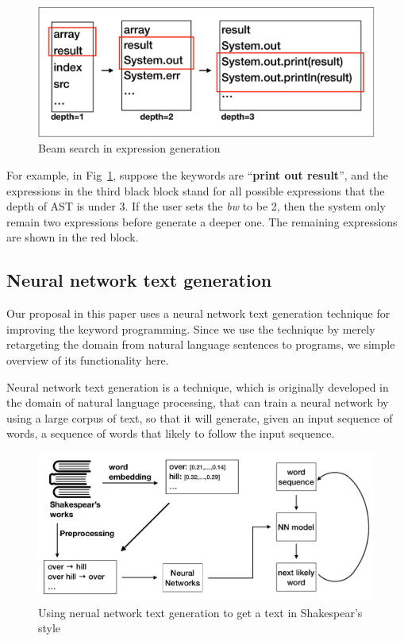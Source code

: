 \documentclass[PRO,english]{ipsj}
\begin{document}
\begin{figure}[!ht]
\centering
\includegraphics[scale=0.23]{Figure/BeamSearch.pdf}
\caption{Beam search in expression generation}
\label{fig:BeamSearch}
\end{figure}

For example, in Fig~\ref{fig:BeamSearch}, suppose the keywords are ``\textbf{print out result}'', and the expressions in the third black block stand for all possible expressions that the depth of AST is under 3. If the user sets the \emph{bw} to be 2, then the system only remain two expressions before generate a deeper one. The remaining expressions are shown in the red block.


\subsection{Neural network text generation}

Our proposal in this paper uses a neural network text generation technique for improving the keyword programming.  Since we use the technique by merely retargeting the domain from natural language sentences to programs, we simple overview of its functionality here.

Neural network text generation is a technique, which is originally developed in the domain of natural language processing, that can train a neural network by using a large corpus of text, so that it will generate, given an input sequence of words, a sequence of words that likely to follow the input sequence.  


\begin{figure}[!ht]
\centering
\includegraphics[scale=0.3]{Figure/NNTG.pdf}
\caption{Using nerual network text generation to get a text in Shakespear's style}
\label{fig:NNTG}
\end{figure}
\end{document}
